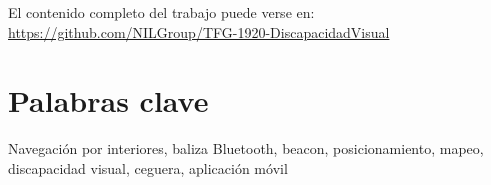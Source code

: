 El contenido completo del trabajo puede verse en: \url{https://github.com/NILGroup/TFG-1920-DiscapacidadVisual}

\section*{Palabras clave}
   
\noindent Navegación por interiores, baliza Bluetooth, beacon, posicionamiento, mapeo, discapacidad visual, ceguera, aplicación móvil
   


